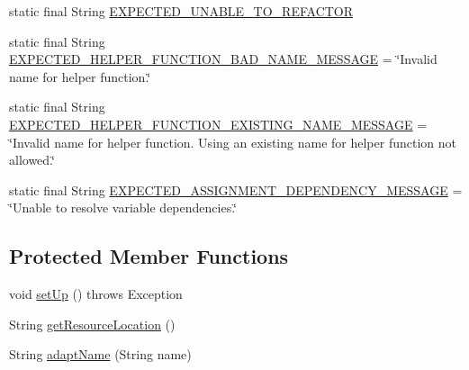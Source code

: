 \begin{DoxyCompactItemize}
\item 
static final String \hyperlink{classedu_1_1illinois_1_1canistelCassabanana_1_1tests_1_1RemoveDuplicateCodeInConstructorsRefactoringTests_a6662ff002bec870d7dca4f167c1250f0}{EXPECTED\_\-UNABLE\_\-TO\_\-REFACTOR}
\item 
static final String \hyperlink{classedu_1_1illinois_1_1canistelCassabanana_1_1tests_1_1RemoveDuplicateCodeInConstructorsRefactoringTests_abf64483c95692832bdde45b66128aff9}{EXPECTED\_\-HELPER\_\-FUNCTION\_\-BAD\_\-NAME\_\-MESSAGE} = \char`\"{}Invalid name for helper function.\char`\"{}
\item 
static final String \hyperlink{classedu_1_1illinois_1_1canistelCassabanana_1_1tests_1_1RemoveDuplicateCodeInConstructorsRefactoringTests_a6f8cf4d45d976c0d1e82e0a89ca2ab99}{EXPECTED\_\-HELPER\_\-FUNCTION\_\-EXISTING\_\-NAME\_\-MESSAGE} = \char`\"{}Invalid name for helper function. Using an existing name for helper function not allowed.\char`\"{}
\item 
static final String \hyperlink{classedu_1_1illinois_1_1canistelCassabanana_1_1tests_1_1RemoveDuplicateCodeInConstructorsRefactoringTests_af2137a25d70680689bc1cc93d92106db}{EXPECTED\_\-ASSIGNMENT\_\-DEPENDENCY\_\-MESSAGE} = \char`\"{}Unable to resolve variable dependencies.\char`\"{}
\end{DoxyCompactItemize}
\subsection*{Protected Member Functions}
\begin{DoxyCompactItemize}
\item 
void \hyperlink{classedu_1_1illinois_1_1canistelCassabanana_1_1tests_1_1RemoveDuplicateCodeInConstructorsRefactoringTests_afb718ed747bbde75a5d5c4e955915def}{setUp} ()  throws Exception 
\item 
String \hyperlink{classedu_1_1illinois_1_1canistelCassabanana_1_1tests_1_1RemoveDuplicateCodeInConstructorsRefactoringTests_ae1e7b0a9eb31811720730a644c2e116a}{getResourceLocation} ()
\item 
String \hyperlink{classedu_1_1illinois_1_1canistelCassabanana_1_1tests_1_1RemoveDuplicateCodeInConstructorsRefactoringTests_aeb1da62dad72af83ae5fee23034c9c40}{adaptName} (String name)
\end{DoxyCompactItemize}
